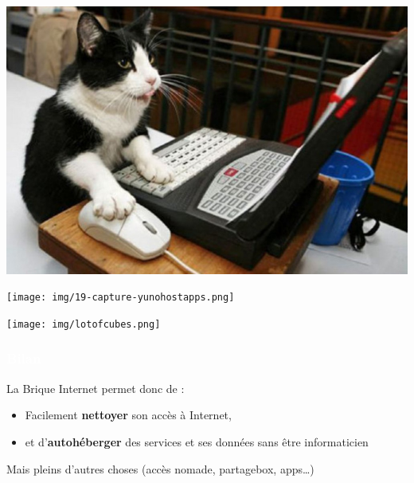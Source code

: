 \documentclass[notes=hide]{beamer}
\begin{document}
\begin{frame}[t,plain]
\begin{center}
  \vspace{\fill}
  \includegraphics[width=\textwidth]{img/cat-laptop.jpg}
  \vspace{\fill}
\end{center}
\end{frame}

\begin{frame}[t]
\begin{center}
\vfill
\texttt{[image: img/19-capture-yunohostapps.png]}
\vfill
\end{center}
\end{frame}

\begin{frame}[t,plain]
\begin{center}
\vspace{\fill}
  \vspace{\fill}
\end{center}
\end{frame}

\begin{frame}[t,plain]
\begin{center}
  \vspace{\fill}
  \texttt{[image: img/lotofcubes.png]}
  \vspace{\fill}
\end{center}
\end{frame}

\begin{frame}[t]
\frametitle{\textcolor{white}{Bilan}}
  \begin{center}
    La Brique Internet permet donc de :
    \vfill
    \begin{itemize}
      \item Facilement \textbf{nettoyer} son accès à Internet,
      \item et d'\textbf{autohéberger} des services et ses données sans être informaticien
    \end{itemize}
    \end{center}
    \vfill
    Mais pleins d'autres choses (accès nomade, partagebox, apps…)
\end{frame}
\end{document}
